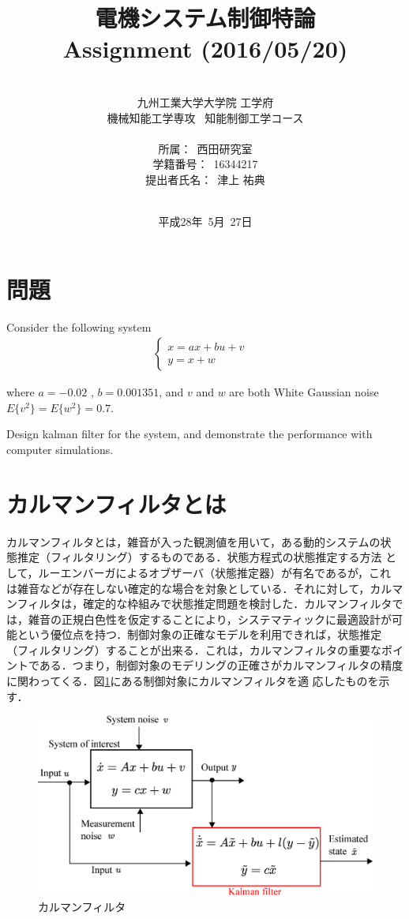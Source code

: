 \documentclass[a4paper,12pt]{jarticle}
\title{電機システム制御特論 \\
Assignment (2016/05/20)\\
}
\author{\vspace{40mm}\\
九州工業大学大学院 \hspace{0mm} 工学府\\
機械知能工学専攻\ \hspace{0mm} 知能制御工学コース \\
\vspace{5mm}\\
所属：\ 西田研究室\\
学籍番号：\ 16344217\\
提出者氏名：\ 津上 \hspace{0mm} 祐典\\\vspace{5mm}\\ }
\date{平成28年\ 5月\ 27日}
\begin{document}
\titlepage
\maketitle
\thispagestyle{empty}

\newpage

\thispagestyle{empty}
\tableofcontents

\newpage
\setcounter{page}{1}
\section{問題}
Consider the following system
%
\begin{eqnarray}
 \begin{cases}
  x = ax + bu + v & \\
  y = x + w
 \end{cases}
\end{eqnarray}
%

where $a=-0.02$ , $b=0.001351$, and $v$ and $w$ are both White Gaussian
noise $E \bigl\{ v^2 \bigr\} = E \bigl\{ w^2 \bigr\} = 0.7$.

Design kalman filter for the system, and demonstrate the performance
with computer simulations.

\section{カルマンフィルタとは}
カルマンフィルタとは，雑音が入った観測値を用いて，ある動的システムの状
態推定（フィルタリング）するものである．状態方程式の状態推定する方法
として，ルーエンバーガによるオブザーバ（状態推定器）が有名であるが，これ
は雑音などが存在しない確定的な場合を対象としている．それに対して，カルマ
ンフィルタは，確定的な枠組みで状態推定問題を検討した．カルマンフィルタで
は，雑音の正規白色性を仮定することにより，システマティックに最適設計が可
能という優位点を持つ．制御対象の正確なモデルを利用できれば，状態推定
（フィルタリング）することが出来る．これは，カルマンフィルタの重要なポイ
ントである．つまり，制御対象のモデリングの正確さがカルマンフィルタの精度
に関わってくる．図\ref{fig:kalman_m}にある制御対象にカルマンフィルタを適
応したものを示す．

%
\begin{figure}[htbp]
 \begin{center}
  \includegraphics[width = 150mm]{fig/kalman_model.eps}
 \end{center}
 \caption{カルマンフィルタ}
 \label{fig:kalman_m}
\end{figure}
%
\end{document}
